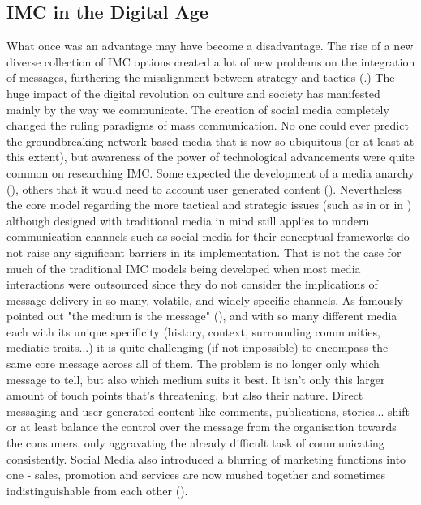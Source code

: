 \documentclass[11pt]{article}
\begin{document}
 \subsection{IMC in the Digital Age}\label{digitalage}
 
What once was an advantage may have become a disadvantage. The rise of a new diverse collection of IMC options created a lot of new problems on the integration of messages, furthering the misalignment between strategy and tactics (\cite{holm}.) The huge impact of the digital revolution on culture and society has manifested mainly by the way we communicate. The creation of social media completely changed the ruling paradigms of mass communication. No one could ever predict the groundbreaking network based media that is now so ubiquitous (or at least at this extent), but awareness of the power of technological advancements were quite common on researching IMC. Some expected the development of a media anarchy (\cite{solomon}), others that it would need to account user generated content (\cite{ananda}). Nevertheless the core model regarding the more tactical and strategic issues (such as \citeauthor{schultz} in \citeyear{schultz} or \citeauthor{duncan} in \citeyear{duncan}) although designed with traditional media in mind still applies to modern communication channels such as social media for their conceptual frameworks do not raise any significant barriers in its implementation. That is not the case for much of the traditional IMC models being developed when most media interactions were outsourced since they do not consider the implications of message delivery in so many, volatile, and widely specific channels. As \citeauthor{mcluhan} famously pointed out "the medium is the message" (\citeyear{mcluhan}), and with so many different media each with its unique specificity (history, context, surrounding communities, mediatic traits...) it is quite challenging (if not impossible) to encompass the same core message across all of them. The problem is no longer only which message to tell, but also which medium suits it best. It isn't only this larger amount of touch points that's threatening, but also their nature. Direct messaging and user generated content like comments, publications, stories... shift or at least balance the control over the message from the organisation towards the consumers, only aggravating the already difficult task of communicating consistently. Social Media also introduced a blurring of marketing functions into one - sales, promotion and services are now mushed together and sometimes indistinguishable from each other (\cite{valos}).  
\end{document}

